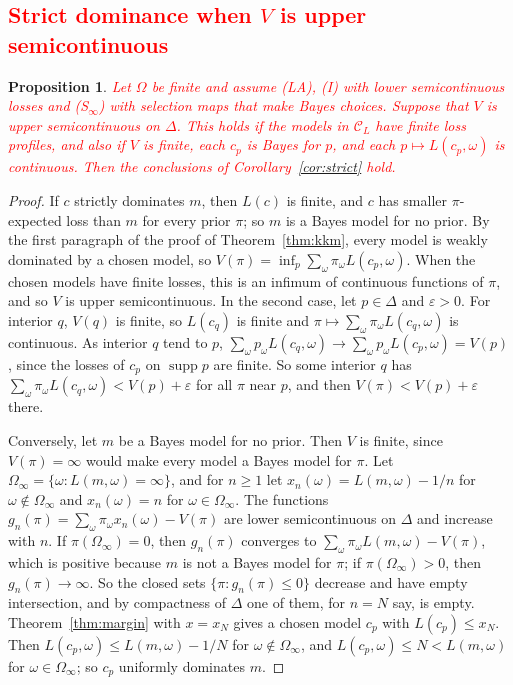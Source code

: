 \documentclass[11pt]{article}
\newtheorem{proposition}[theorem]{Proposition}
\theoremstyle{definition}
\theoremstyle{remark}
\newcommand{\C}{\mathcal C}
\newcommand{\supp}{\operatorname{supp}}
\begin{document}
\subsection{\textcolor{red}{Strict dominance when $V$ is upper semicontinuous}}
\begin{proposition}\label{prop:strict-general}
\textcolor{red}{Let $\Omega$ be finite and assume (LA), (I) with lower semicontinuous losses and (S$_\infty$) with selection maps that make Bayes choices. Suppose that $V$ is upper semicontinuous on $\Delta$. This holds if the models in $\C_L$ have finite loss profiles, and also if $V$ is finite, each $c_p$ is Bayes for $p$, and each $p\mapsto L(c_p,\omega)$ is continuous. Then the conclusions of Corollary~\ref{cor:strict} hold.}
\end{proposition}
\begin{proof}
If $c$ strictly dominates $m$, then $L(c)$ is finite, and $c$ has smaller $\pi$-expected loss than $m$ for every prior $\pi$; so $m$ is a Bayes model for no prior. By the first paragraph of the proof of Theorem~\ref{thm:kkm}, every model is weakly dominated by a chosen model, so $V(\pi)=\inf_p\sum_\omega\pi_\omega L(c_p,\omega)$. When the chosen models have finite losses, this is an infimum of continuous functions of $\pi$, and so $V$ is upper semicontinuous. In the second case, let $p\in\Delta$ and $\varepsilon>0$. For interior $q$, $V(q)$ is finite, so $L(c_q)$ is finite and $\pi\mapsto\sum_\omega\pi_\omega L(c_q,\omega)$ is continuous. As interior $q$ tend to $p$, $\sum_\omega p_\omega L(c_q,\omega)\to\sum_\omega p_\omega L(c_p,\omega)=V(p)$, since the losses of $c_p$ on $\supp p$ are finite. So some interior $q$ has $\sum_\omega\pi_\omega L(c_q,\omega)<V(p)+\varepsilon$ for all $\pi$ near $p$, and then $V(\pi)<V(p)+\varepsilon$ there.

Conversely, let $m$ be a Bayes model for no prior. Then $V$ is finite, since $V(\pi)=\infty$ would make every model a Bayes model for $\pi$. Let $\Omega_\infty=\{\omega:L(m,\omega)=\infty\}$, and for $n\ge1$ let $x_n(\omega)=L(m,\omega)-1/n$ for $\omega\notin\Omega_\infty$ and $x_n(\omega)=n$ for $\omega\in\Omega_\infty$. The functions $g_n(\pi)=\sum_\omega\pi_\omega x_n(\omega)-V(\pi)$ are lower semicontinuous on $\Delta$ and increase with $n$. If $\pi(\Omega_\infty)=0$, then $g_n(\pi)$ converges to $\sum_\omega\pi_\omega L(m,\omega)-V(\pi)$, which is positive because $m$ is not a Bayes model for $\pi$; if $\pi(\Omega_\infty)>0$, then $g_n(\pi)\to\infty$. So the closed sets $\{\pi:g_n(\pi)\le0\}$ decrease and have empty intersection, and by compactness of $\Delta$ one of them, for $n=N$ say, is empty. Theorem~\ref{thm:margin} with $x=x_N$ gives a chosen model $c_p$ with $L(c_p)\le x_N$. Then $L(c_p,\omega)\le L(m,\omega)-1/N$ for $\omega\notin\Omega_\infty$, and $L(c_p,\omega)\le N<L(m,\omega)$ for $\omega\in\Omega_\infty$; so $c_p$ uniformly dominates $m$.
\end{proof}
\end{document}
